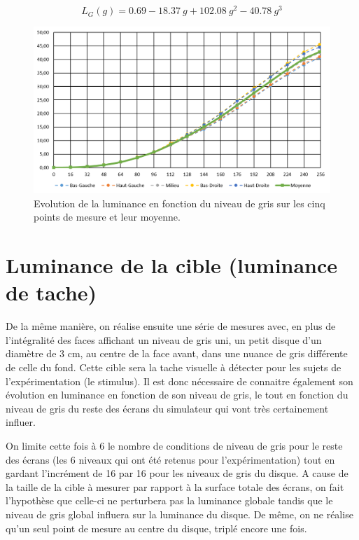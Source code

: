 	\begin{equation}
		L_G(g) = 0.69 - 18.37~g + 102.08~g^2 -40.78~g^3
		\label{eq:regression_luminance_globale}
	\end{equation}
	
	\begin{figure}[h]
		\centering
		\includegraphics[scale=.75]{Figures/EvolutionLuminanceGlobale}
		\caption{Evolution de la luminance en fonction du niveau de gris sur les cinq points de mesure et leur moyenne.}
		\label{fig:evolution_luminance_background}
	\end{figure}
	
	\section{Luminance de la cible (luminance de tache)}
	\par De la même manière, on réalise ensuite une série de mesures avec, en plus de l'intégralité des faces affichant un niveau de gris uni, un petit disque d'un diamètre de 3 cm, au centre de la face avant, dans une nuance de gris différente de celle du fond. Cette cible sera la tache visuelle à détecter pour les sujets de l'expérimentation (le stimulus). Il est donc nécessaire de connaitre également son évolution en luminance en fonction de son niveau de gris, le tout en fonction du niveau de gris du reste des écrans du simulateur qui vont très certainement influer.
	
	\par On limite cette fois à 6 le nombre de conditions de niveau de gris pour le reste des écrans (les 6 niveaux qui ont été retenus pour l'expérimentation) tout en gardant l'incrément de 16 par 16 pour les niveaux de gris du disque. A cause de la taille de la cible à mesurer par rapport à la surface totale des écrans, on fait l'hypothèse que celle-ci ne perturbera pas la luminance globale tandis que le niveau de gris global influera sur la luminance du disque. De même, on ne réalise qu'un seul point de mesure au centre du disque, triplé encore une fois.
	

